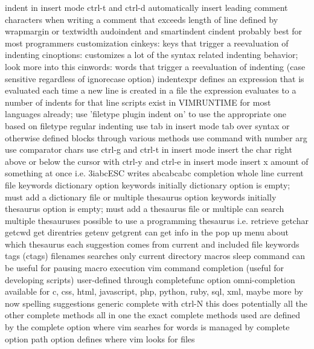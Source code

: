 \documentclass[12pt]{book}
\begin{document}
          indent in insert mode ctrl-t and ctrl-d
          automatically insert leading comment characters when writing a comment that exceeds length of line defined by wrapmargin or textwidth
          audoindent and smartindent
          cindent
            probably best for most programmers
            customization
              cinkeys: keys that trigger a reevaluation of indenting
              cinoptions: customizes a lot of the syntax related indenting behavior; look more into this
              cinwords: words that trigger a reevaluation of indenting (case sensitive regardless of ignorecase option)
          indentexpr
            defines an expression that is evaluated each time a new line is created in a file
            the expression evaluates to a number of indents for that line
            scripts exist in VIMRUNTIME for most languages already; use 'filetype plugin indent on' to use the appropriate one based on filetype
        regular indenting
          use tab in insert mode
          tab over syntax or otherwise defined blocks through various methods
          use command with number arg
          use comparator chars
          use ctrl-g and ctrl-t in insert mode
      insert the char right above or below the cursor with ctrl-y and ctrl-e in insert mode
      insert x amount of something at once i.e. 3iabcESC writes abcabcabc
    completion
      whole line
      current file keywords
      dictionary option keywords
        initially dictionary option is empty; must add a dictionary file or multiple
      thesaurus option keywords
        initially thesaurus option is empty; must add a thesaurus file or multiple
        can search multiple thesauruses
        possible to use a programming thesaurus i.e. retrieve getchar getcwd get direntries getenv getgrent
        can get info in the pop up menu about which thesaurus each suggestion comes from
      current and included file keywords
      tags (ctags)
      filenames
        searches only current directory
      macros
        sleep command can be useful for pausing macro execution
      vim command completion (useful for developing scripts)
      user-defined through completefunc option
      omni-completion
        available for c, css, html, javascript, php, python, ruby, sql, xml, maybe more by now
      spelling suggestions
      generic complete with ctrl-N
        this does potentially all the other complete methods all in one
        the exact complete methods used are defined by the complete option
      where vim searhes for words is managed by complete option
      path option defines where vim looks for files
\end{document}
